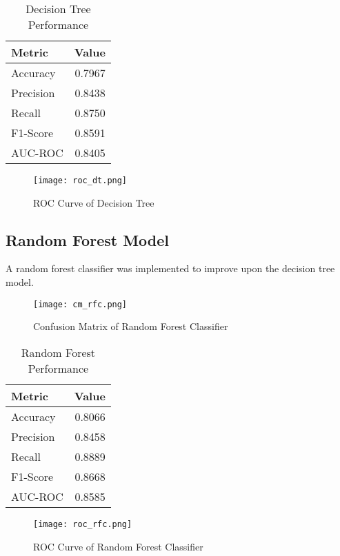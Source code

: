 \documentclass[12pt]{article}
\begin{document}
\begin{table}[H]
\centering
\caption{Decision Tree Performance}
\label{tab:dt_perf}
\begin{tabular}{lr}
\toprule
\textbf{Metric} & \textbf{Value} \\
\midrule
Accuracy & 0.7967 \\
Precision & 0.8438 \\
Recall & 0.8750 \\
F1-Score & 0.8591 \\
AUC-ROC & 0.8405 \\
\bottomrule
\end{tabular}
\end{table}

\begin{figure}[H]
    \centering
    \texttt{[image: roc\_dt.png]}
    \caption{ROC Curve of Decision Tree}
    \label{fig:example}
\end{figure}



\subsection{Random Forest Model}
A random forest classifier was implemented to improve upon the decision tree model.

\begin{figure}[H]
    \centering
    \texttt{[image: cm\_rfc.png]}
    \caption{Confusion Matrix of Random Forest Classifier}
    \label{fig:example}
\end{figure}


\begin{table}[H]
\centering
\caption{Random Forest Performance}
\label{tab:rf_perf}
\begin{tabular}{lr}
\toprule
\textbf{Metric} & \textbf{Value} \\
\midrule
Accuracy & 0.8066 \\
Precision & 0.8458 \\
Recall & 0.8889 \\
F1-Score & 0.8668 \\
AUC-ROC & 0.8585 \\
\bottomrule
\end{tabular}
\end{table}

\begin{figure}[H]
    \centering
    \texttt{[image: roc\_rfc.png]}
    \caption{ROC Curve of Random Forest Classifier}
    \label{fig:example}
\end{figure}
\end{document}
